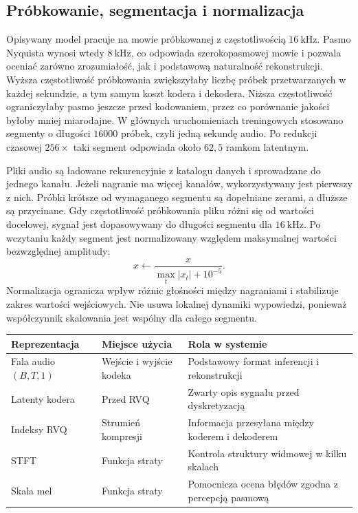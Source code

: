 \subsection{Próbkowanie, segmentacja i normalizacja}

Opisywany model pracuje na mowie próbkowanej z częstotliwością \(16\ \mathrm{kHz}\). Pasmo Nyquista wynosi wtedy \(8\ \mathrm{kHz}\), co odpowiada szerokopasmowej mowie i pozwala oceniać zarówno zrozumiałość, jak i podstawową naturalność rekonstrukcji. Wyższa częstotliwość próbkowania zwiększyłaby liczbę próbek przetwarzanych w każdej sekundzie, a tym samym koszt kodera i dekodera. Niższa częstotliwość ograniczyłaby pasmo jeszcze przed kodowaniem, przez co porównanie jakości byłoby mniej miarodajne. W głównych uruchomieniach treningowych stosowano segmenty o długości \(16000\) próbek, czyli jedną sekundę audio. Po redukcji czasowej \(256\times\) taki segment odpowiada około \(62{,}5\) ramkom latentnym.

Pliki audio są ładowane rekurencyjnie z katalogu danych i sprowadzane do jednego kanału. Jeżeli nagranie ma więcej kanałów, wykorzystywany jest pierwszy z nich. Próbki krótsze od wymaganego segmentu są dopełniane zerami, a dłuższe są przycinane. Gdy częstotliwość próbkowania pliku różni się od wartości docelowej, sygnał jest dopasowywany do długości segmentu dla \(16\ \mathrm{kHz}\). Po wczytaniu każdy segment jest normalizowany względem maksymalnej wartości bezwzględnej amplitudy:
\[
x \leftarrow \frac{x}{\max_t |x_t| + 10^{-5}}.
\]
Normalizacja ogranicza wpływ różnic głośności między nagraniami i stabilizuje zakres wartości wejściowych. Nie usuwa lokalnej dynamiki wypowiedzi, ponieważ współczynnik skalowania jest wspólny dla całego segmentu.

\begin{center}
\centering
\small
\begin{tabular}{>{\raggedright\arraybackslash}p{} >{\raggedright\arraybackslash}p{} >{\raggedright\arraybackslash}p{}}
\toprule
Reprezentacja & Miejsce użycia & Rola w systemie \\
\midrule
Fala audio \((B,T,1)\) & Wejście i wyjście kodeka & Podstawowy format inferencji i rekonstrukcji \\
Latenty kodera & Przed RVQ & Zwarty opis sygnału przed dyskretyzacją \\
Indeksy RVQ & Strumień kompresji & Informacja przesyłana między koderem i dekoderem \\
STFT & Funkcja straty & Kontrola struktury widmowej w kilku skalach \\
Skala mel & Funkcja straty & Pomocnicza ocena błędów zgodna z percepcją pasmową \\
\bottomrule
\end{tabular}
\label{tab:reprezentacje-sygnalu}
\end{center}

